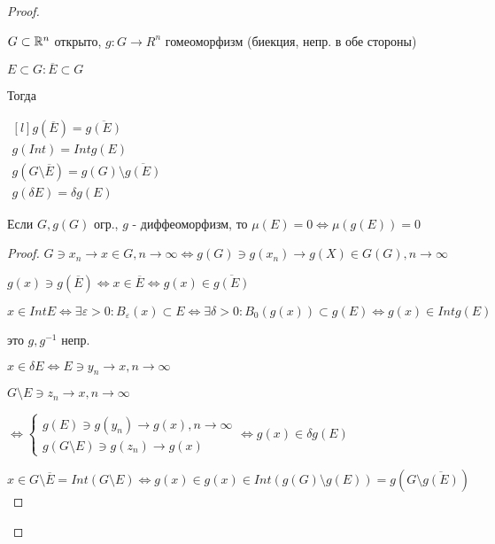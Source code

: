 \begin{proof}
    \begin{lemma}
        $G \subset \mathbb{R}^n$ открыто, $g: G \to R^n$ гомеоморфизм (биекция, непр. в обе стороны)
    
        $E \subset G: \overline{E} \subset G$

        Тогда 
        
        $\begin{matrix*}[l]
            g(\overline{E}) = \overline{g(E)} \\
    
            g(Int) = Int g(E)\\
    
            g(G\setminus\overline{E}) = g(G) \setminus \overline{g(E)}\\
    
            g(\delta E) = \delta g(E) 
        \end{matrix*}$

        Если $G, g(G)$ огр., $g$ - диффеоморфизм, то $\mu(E) = 0 \iff \mu(g(E))=0$
    \end{lemma}    
    \begin{proof}
        $G \ni x_n \to x \in G, n \to \infty \iff 
        g(G) \ni g(x_n) \to g(X) \in G(G), n \to \infty
        $

        $g(x) \ni g(\overline{E}) \iff 
        x \in \overline{E} 
        \iff g(x) \in \overline{g(E)}$

        $x \in Int E \iff \exists \varepsilon > 0 : B_\varepsilon(x) \subset E
        \iff \exists \delta > 0 : B_0 (g(x)) \subset g(E) 
        \iff g(x) \in Int g(E)$

        это $g, g^{-1}$ непр.

        $x \in \delta E \iff E \ni y_n \to x, n \to \infty $

        $G \setminus E \ni z_n \to x, n\to \infty$

        $\iff
        \begin{cases}
            g(E) \ni g(y_n) \to g(x), n \to \infty \\
            g(G\setminus E) \ni g(z_n) \to g(x)
        \end{cases}
        \iff g(x) \in \delta g(E)
        $

        $x \in G \setminus\overline{E} = Int(G \setminus E) \iff 
        g(x) \in g(x) \in Int(g(G)\setminus g(E)) = g(G \setminus \overline{g(E)})$
    \end{proof}


\end{proof}
